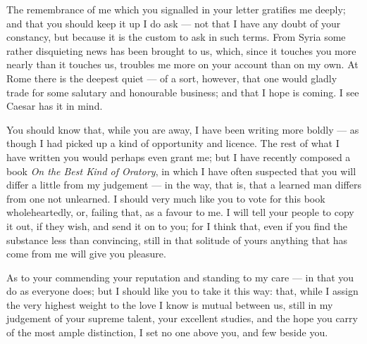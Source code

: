 

 The remembrance of me which you signalled in your letter gratifies me deeply; and that you should keep it up I do ask --- not that I have any doubt of your constancy, but because it is the custom to ask in such terms. From Syria some rather disquieting news has been brought to us, which, since it touches you more nearly than it touches us, troubles me more on your account than on my own. At Rome there is the deepest quiet --- of a sort, however, that one would gladly trade for some salutary and honourable business; and that I hope is coming. I see Caesar has it in mind.

 You should know that, while you are away, I have been writing more boldly --- as though I had picked up a kind of opportunity and licence. The rest of what I have written you would perhaps even grant me; but I have recently composed a book \textit{On the Best Kind of Oratory}, in which I have often suspected that you will differ a little from my judgement --- in the way, that is, that a learned man differs from one not unlearned. I should very much like you to vote for this book wholeheartedly, or, failing that, as a favour to me. I will tell your people to copy it out, if they wish, and send it on to you; for I think that, even if you find the substance less than convincing, still in that solitude of yours anything that has come from me will give you pleasure.

 As to your commending your reputation and standing to my care --- in that you do as everyone does; but I should like you to take it this way: that, while I assign the very highest weight to the love I know is mutual between us, still in my judgement of your supreme talent, your excellent studies, and the hope you carry of the most ample distinction, I set no one above you, and few beside you.
